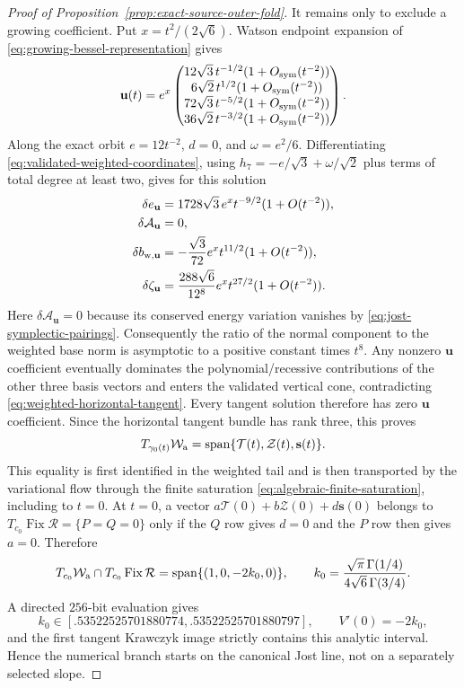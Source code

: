 \documentclass[11pt]{amsart}
\numberwithin{equation}{section}
\theoremstyle{definition}
\theoremstyle{remark}
\newcommand{\cR}{\mathcal R}
\newcommand{\cA}{\mathcal A}
\newcommand{\Fix}{\operatorname {Fix}}
\begin{document}
\begin{proof}[Proof of Proposition~\ref{prop:exact-source-outer-fold}]
It remains only to exclude a growing coefficient.  Put
$x=t^2/(2\sqrt6)$.  Watson endpoint expansion of
\eqref{eq:growing-bessel-representation} gives
\begin{equation}\label{eq:jost-growing-asymptotic}
 \mathbf u(t)=e^x
 \begin{pmatrix}
  12\sqrt3\,t^{-1/2}(1+O_{\rm sym}(t^{-2}))\\
  6\sqrt2\,t^{1/2}(1+O_{\rm sym}(t^{-2}))\\
  72\sqrt3\,t^{-5/2}(1+O_{\rm sym}(t^{-2}))\\
  36\sqrt2\,t^{-3/2}(1+O_{\rm sym}(t^{-2}))
 \end{pmatrix}.
\end{equation}
Along the exact orbit $e=12t^{-2}$, $d=0$, and
$\omega=e^2/6$.  Differentiating
\eqref{eq:validated-weighted-coordinates}, using
$h_7=-e/\sqrt3+\omega/\sqrt2$ plus terms of total degree at least two,
gives for this solution
\begin{align}
 \delta e_{\mathbf u}
 &=1728\sqrt3\,e^x t^{-9/2}(1+O(t^{-2})),\notag\\
 \delta\cA_{\mathbf u}&=0,\notag\\
 \delta b_{{\rm w},\mathbf u}
 &=-\frac{\sqrt3}{72}e^x t^{11/2}(1+O(t^{-2})),
 \label{eq:jost-growing-weighted}\\
 \delta\zeta_{\mathbf u}
 &=\frac{288\sqrt6}{12^8}e^x t^{27/2}(1+O(t^{-2})).\notag
\end{align}
Here $\delta\cA_{\mathbf u}=0$ because its conserved energy variation
vanishes by \eqref{eq:jost-symplectic-pairings}.  Consequently the ratio of
the normal component to the weighted base norm is asymptotic to a positive
constant times $t^8$.  Any nonzero $\mathbf u$ coefficient eventually
dominates the polynomial/recessive contributions of the other three basis
vectors and enters the validated vertical cone, contradicting
\eqref{eq:weighted-horizontal-tangent}.  Every tangent solution therefore
has zero $\mathbf u$ coefficient.  Since the horizontal tangent bundle has
rank three, this proves
\[
 T_{\gamma_0(t)}\mathcal W_{\rm a}
 =\operatorname{span}\{\mathcal T(t),\mathcal Z(t),\mathbf s(t)\}.
\]
This equality is first identified in the weighted tail and is then
transported by the variational flow through the finite saturation
\eqref{eq:algebraic-finite-saturation}, including to $t=0$.
At $t=0$, a vector
$a\mathcal T(0)+b\mathcal Z(0)+d\mathbf s(0)$ belongs to
$T_{c_0}\Fix\cR=\{P=Q=0\}$ only if the $Q$ row gives $d=0$ and the $P$ row
then gives $a=0$.  Therefore
\begin{equation}\label{eq:c0-jost-tangent}
 T_{c_0}\mathcal W_{\rm a}\cap T_{c_0}\Fix\cR
 =\operatorname{span}\{(1,0,-2k_0,0)\},\qquad
 k_0=\frac{\sqrt\pi\,\Gamma(1/4)}
 {4\sqrt6\,\Gamma(3/4)}.
\end{equation}
A directed $256$-bit evaluation gives
\begin{equation}\label{eq:c0-jost-interval}
 k_0\in[.53522525701880774,.53522525701880797],\qquad
 V'(0)=-2k_0,
\end{equation}
and the first tangent Krawczyk image strictly contains this analytic
interval.  Hence the numerical branch starts on the canonical Jost line,
not on a separately selected slope.


\end{proof}
\end{document}
